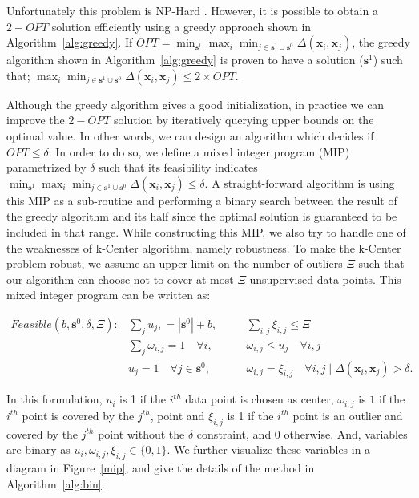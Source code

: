 \documentclass{article} %
\begin{document}
Unfortunately this problem is NP-Hard \citep{cook}. However, it is possible to obtain a $2-OPT$ solution efficiently
using a greedy approach shown in  Algorithm~\ref{alg:greedy}. If $OPT=\min_{\mathbf{s}^1} \max_i \min_{j \in
\mathbf{s}^1 \cup \mathbf{s}^0} \Delta(\mathbf{x}_i,\mathbf{x}_j)$, the greedy algorithm shown in
Algorithm~\ref{alg:greedy} is proven to have a solution ($\mathbf{s}^1$) such that; $ \max_i \min_{j \in \mathbf{s}^1
\cup \mathbf{s}^0} \Delta(\mathbf{x}_i,\mathbf{x}_j) \leq 2 \times OPT$.


Although the greedy algorithm gives a good initialization, in practice we can improve the $2-OPT$ solution by
iteratively querying upper bounds on the optimal value. In other words, we can design an algorithm which decides if $OPT
\leq \delta$. In order to do so, we define a mixed integer program (MIP) parametrized by $\delta$ such that its
feasibility indicates $\min_{\mathbf{s}^1} \max_i \min_{j \in \mathbf{s}^1 \cup \mathbf{s}^0}
\Delta(\mathbf{x}_i,\mathbf{x}_j) \leq \delta$. A straight-forward algorithm is using this MIP as a sub-routine and
performing a binary search between the result of the greedy algorithm and its half since the optimal solution is
guaranteed to be included in that range. While constructing this MIP, we also try to handle one of the weaknesses of
k-Center algorithm, namely robustness. To make the k-Center problem robust, we assume an upper limit on the number of
outliers $\Xi$ such that our algorithm can choose not to cover at most $\Xi$ unsupervised data points. This mixed
integer program can be written as:

\begin{equation}
\begin{aligned}
Feasible(b,\mathbf{s}^0,\delta, \Xi):  &\sum_j  u_j, = |\mathbf{s}^0|+ b,  \quad &&  \sum_{i,j} \xi_{i,j} \leq \Xi \\
&\sum_j \omega_{i,j} = 1\quad \forall  i, \quad && \omega_{i,j} \leq u_j \quad \forall  i,j \\
   & u_j =1 \quad \forall j\in \mathbf{s}^0, \quad && \omega_{i,j} = \xi_{i,j} \quad  \forall i,j \mid   \Delta(\mathbf{x}_i,\mathbf{x}_j)  > \delta .
\end{aligned}\label{eq:mip}
\end{equation}

In this formulation, $u_i$ is 1 if the $i^{th}$ data point is chosen as center, $\omega_{i,j}$ is $1$ if the $i^{th}$
point is covered by the $j^{th}$, point and $\xi_{i,j}$ is 1 if the $i^{th}$ point is an outlier and covered by the
$j^{th}$ point without the $\delta$ constraint, and $0$ otherwise. And, variables are binary as $u_i, \omega_{i,j},
\xi_{i,j} \in \{0,1\}$. We further visualize these variables in a diagram in Figure~\ref{mip}, and give the details of
the method in Algorithm~\ref{alg:bin}. 
\end{document}
